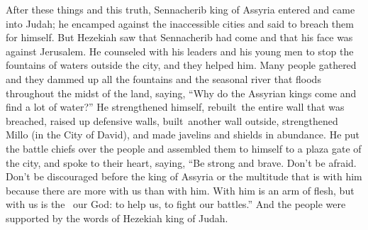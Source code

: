 
\begin{inparaenum}
   After these things and this truth, Sennacherib king of Assyria entered and came into Judah; he encamped against the inaccessible cities and said to breach them for himself.%
   But Hezekiah saw that Sennacherib had come and that his face was against Jerusalem.%
   He counseled with his leaders and his young men to stop the fountains of waters outside the city, and they helped him.%
   Many people gathered and they dammed up all the fountains and the seasonal river that floods throughout the midst of the land, saying, ``Why do the Assyrian kings come and find a lot of water?''%
   He strengthened himself, rebuilt\thinspace\understood{}\ the entire wall that was breached, raised up defensive walls, built\understood{}\ another wall outside, strengthened Millo (in the City of David), and made javelins and shields in abundance.%
   He put the battle chiefs over the people and assembled them to himself to a plaza gate of the city, and spoke to their heart, saying,%
   ``Be strong and brave. Don't be afraid. Don't be discouraged before the king of Assyria or the multitude that is with him because there are more with us than with him.%
   With him is an arm of flesh, but with us is the \lord\ our God: to help us, to fight our battles.'' And the people were supported by the words of Hezekiah king of Judah.%


\end{inparaenum}
